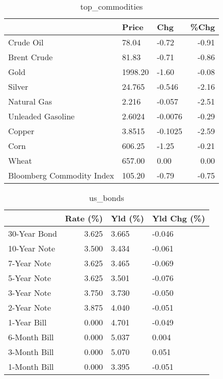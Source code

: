 \documentclass{article}%
\begin{document}
\begin{table}[htbp]%
\caption{top\_commodities}%
\centering%
\begin{adjustbox}{width=1\textwidth}%
\begin{tabular}{lllr}
\toprule
                          &   Price &     Chg &  \%Chg \\
\midrule
               Crude Oil  &   78.04 &   -0.72 & -0.91 \\
             Brent Crude  &   81.83 &   -0.71 & -0.86 \\
                    Gold  & 1998.20 &   -1.60 & -0.08 \\
                  Silver  &  24.765 &  -0.546 & -2.16 \\
             Natural Gas  &   2.216 &  -0.057 & -2.51 \\
       Unleaded Gasoline  &  2.6024 & -0.0076 & -0.29 \\
                  Copper  &  3.8515 & -0.1025 & -2.59 \\
                    Corn  &  606.25 &   -1.25 & -0.21 \\
                   Wheat  &  657.00 &    0.00 &  0.00 \\
Bloomberg Commodity Index &  105.20 &   -0.79 & -0.75 \\
\bottomrule
\end{tabular}
%
\end{adjustbox}%
\end{table}

%


\begin{table}[htbp]%
\caption{us\_bonds}%
\centering%
\begin{adjustbox}{width=1\textwidth}%
\begin{tabular}{lrll}
\toprule
             &  Rate (\%) & Yld (\%) & Yld Chg (\%) \\
\midrule
30-Year Bond &     3.625 &   3.665 &      -0.046 \\
10-Year Note &     3.500 &   3.434 &      -0.061 \\
 7-Year Note &     3.625 &   3.465 &      -0.069 \\
 5-Year Note &     3.625 &   3.501 &      -0.076 \\
 3-Year Note &     3.750 &   3.730 &      -0.050 \\
 2-Year Note &     3.875 &   4.040 &      -0.051 \\
 1-Year Bill &     0.000 &   4.701 &      -0.049 \\
6-Month Bill &     0.000 &   5.037 &       0.004 \\
3-Month Bill &     0.000 &   5.070 &       0.051 \\
1-Month Bill &     0.000 &   3.395 &      -0.051 \\
\bottomrule
\end{tabular}
%
\end{adjustbox}%
\end{table}
\end{document}
